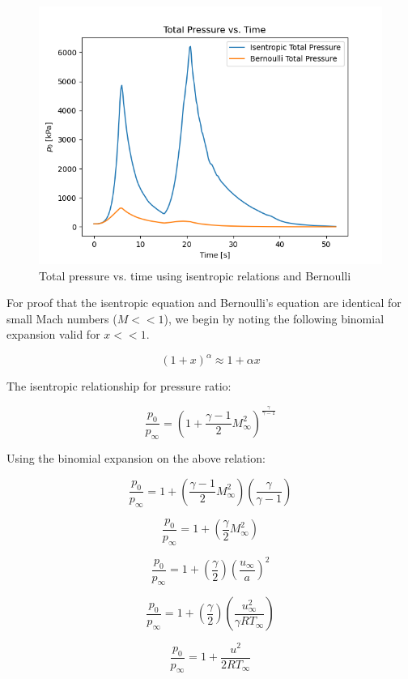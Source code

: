 \documentclass[../main.tex]{subfiles}
\begin{document}
\begin{figure}[h!]
    \centering
    \includegraphics[scale=.7]{../../images/problem_1/Pt_vs_Time_Isen_Bernoulli.png}
    \caption{Total pressure vs. time using isentropic relations and Bernoulli}
    \label{Pt_v_t}
\end{figure}

For proof that the isentropic equation and Bernoulli's equation are identical for small Mach numbers (\(M<<1\)), we begin by noting the following binomial expansion valid for \(x<<1\).

\[
    \left({1 + x}\right)^\alpha \approx 1 + \alpha x  
\]

The isentropic relationship for pressure ratio:

\[
    \frac{p_0}{p_\infty} = {\left({1 + \frac{\gamma-1}{2}M_\infty^2}\right)} ^ {\frac{\gamma}{\gamma-1}}  
\]

Using the binomial expansion on the above relation:

\[
    \frac{p_0}{p_\infty} = 1 + \left({\frac{\gamma-1}{2}M_\infty^2}\right) \left({\frac{\gamma}{\gamma-1}}\right)
\]

\[
    \frac{p_0}{p_\infty} = 1 + \left({\frac{\gamma}{2}M_\infty^2}\right) 
\]

\[
    \frac{p_0}{p_\infty} = 1 + \left({\frac{\gamma}{2}}\right)\left({{\frac{u_\infty}{a}}}\right)^2 
\]

\[
    \frac{p_0}{p_\infty} = 1 + \left({\frac{\gamma}{2}}\right)\left({{\frac{u_\infty^2}{\gamma R T_\infty}}}\right) 
\]

\[
    \frac{p_0}{p_\infty} = 1 + \frac{u^2}{2RT_\infty}
\]
\end{document}
